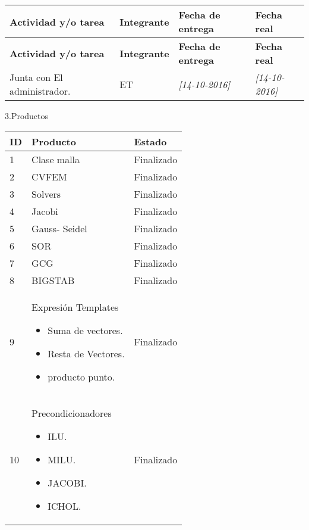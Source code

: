 \documentclass[12pt]{report}
\numberwithin{equation}{section}
\begin{document}
\begin{flushleft}
\begin{longtable}[H]{|m{5cm}|m{3cm}|m{3cm}|m{3cm}|} 
\hline
\small{\textbf{Actividad y/o tarea }} &\small{ \textbf{Integrante}} & \small{\textbf{Fecha de entrega}} & \small{\textbf{Fecha real}}\\
\hline \hline
\endfirsthead

\hline
\small{\textbf{Actividad y/o tarea }} &\small{ \textbf{Integrante}} & \small{\textbf{Fecha de entrega}} & \small{\textbf{Fecha real}}\\
\hline \hline
\endhead
\hline
\endfoot

\endlastfoot
\hline
\hline
\small{Junta con El administrador.} & \small{ET} &\small{ \textit{[14-10-2016]}} & \small{\textit{[14-10-2016]}}\\
\hline
\hline
\end{longtable}

\newpage

\large{3.Productos }
\begin{table}[H]
\begin{tabular}{|m{0.5cm}|m{7.5cm}|m{6cm}|}
\hline 
\textbf{ID } & \textbf{Producto} & \textbf{Estado} \\
\hline
\hline
 1 & \small{Clase malla} & \small{Finalizado}\\
\hline
 2 & \small{CVFEM} & \small{Finalizado}\\
\hline
 3 & \small{Solvers} & \small{Finalizado}\\
\hline
 4 & \small{Jacobi} & \small{Finalizado}\\
\hline
 5 & \small{Gauss- Seidel} & \small{Finalizado}\\
\hline
 6 & \small{SOR} & \small{Finalizado}\\
\hline
 7 & \small{GCG} & \small{Finalizado}\\
\hline
 8 & \small{BIGSTAB} & \small{Finalizado}\\
\hline
 9 & \small{Expresión Templates \begin{itemize}
 \item Suma de vectores.
 \item Resta de Vectores.
 \item producto punto.
 \end{itemize}} & \small{Finalizado}\\
\hline
10 & \small{Precondicionadores \begin{itemize}
\item ILU.
\item MILU.
\item JACOBI.
\item ICHOL.
\end{itemize}} & \small{Finalizado}\\
\hline
\end{tabular}
\label{tabla: TABLA CE Productos}
\end{table}



\end{flushleft}
\end{document}

